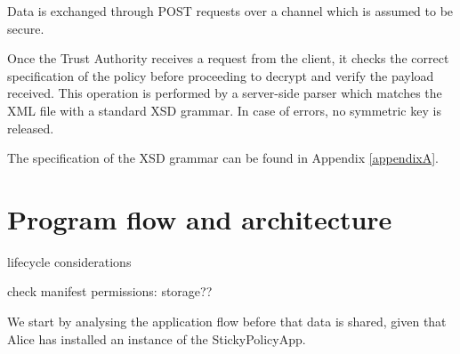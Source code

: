 Data is exchanged through POST requests over a channel which is assumed to be secure.

Once the Trust Authority receives a request from the client, it checks the correct specification of the policy before proceeding to decrypt and verify the payload received. This operation is performed by a server-side parser which matches the XML file with a standard XSD grammar. In case of errors, no symmetric key is released.

The specification of the XSD grammar can be found in Appendix \ref{appendixA}. 

\section{Program flow and architecture}
lifecycle considerations

check manifest permissions: storage??

We start by analysing the application flow before that data is shared, given that Alice has installed an instance of the StickyPolicyApp.

